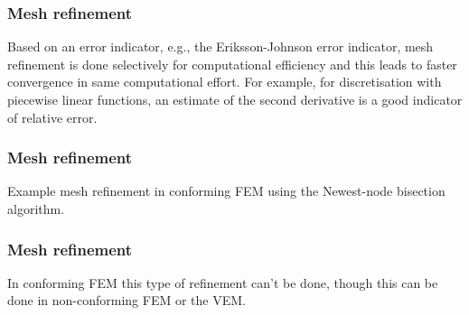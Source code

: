 \documentclass{beamer}
\begin{document}




\begin{frame}
\frametitle{Mesh refinement}
Based on an error indicator, e.g., the Eriksson-Johnson error indicator, mesh refinement is done selectively for computational efficiency and this leads to faster convergence in same computational effort.
\linebreak\linebreak
For example, for discretisation with piecewise linear functions, an estimate of the second derivative is a good indicator of relative error.
\end{frame}




\begin{frame}
\frametitle{Mesh refinement}
Example mesh refinement in conforming FEM using the Newest-node bisection algorithm.
\linebreak
\linebreak
\end{frame}


\begin{frame}
\frametitle{Mesh refinement}
	\linebreak
	\linebreak
	In conforming FEM this type of refinement can't be done, though this can be done in non-conforming FEM or the VEM.
	
\end{frame}
\end{document}
